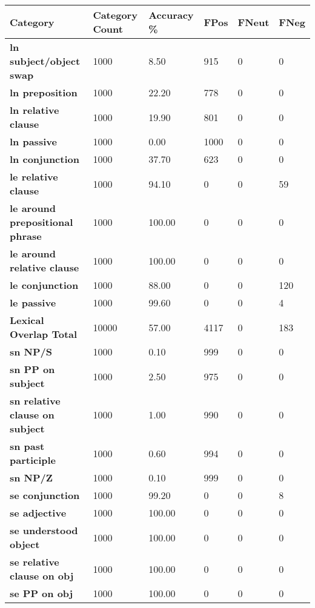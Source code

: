 \documentclass[11pt,a4paper]{article}
\begin{document}
\begin{table}[!hbt]
    \centering
    \tiny
    \centering
    \begin{tabular}{p{}|p{} p{} p{} p{} p{} }
        \textbf{Category} & \textbf{Category Count} & \textbf{Accuracy \%} & \textbf{FPos} & \textbf{FNeut} & \textbf{FNeg} \\
        \hline
        \textbf{ln subject/object swap} & 1000 & 8.50 & 915 & 0 & 0 \\
        \textbf{ln preposition} & 1000 & 22.20 & 778 & 0 & 0 \\
        \textbf{ln relative clause} & 1000 & 19.90 & 801 & 0 & 0 \\
        \textbf{ln passive} & 1000 & 0.00 & 1000 & 0 & 0 \\
        \textbf{ln conjunction} & 1000 & 37.70 & 623 & 0 & 0 \\
        \textbf{le relative clause} & 1000 & 94.10 & 0 & 0 & 59 \\
        \textbf{le around prepositional phrase} & 1000 & 100.00 & 0 & 0 & 0 \\
        \textbf{le around relative clause} & 1000 & 100.00 & 0 & 0 & 0 \\
        \textbf{le conjunction} & 1000 & 88.00 & 0 & 0 & 120 \\
        \textbf{le passive} & 1000 & 99.60 & 0 & 0 & 4 \\
        \textbf{Lexical Overlap Total} & 10000 & 57.00 & 4117 & 0 & 183 \\
        \hline
        \textbf{sn NP/S} & 1000 & 0.10 & 999 & 0 & 0 \\
        \textbf{sn PP on subject} & 1000 & 2.50 & 975 & 0 & 0 \\
        \textbf{sn relative clause on subject} & 1000 & 1.00 & 990 & 0 & 0 \\
        \textbf{sn past participle} & 1000 & 0.60 & 994 & 0 & 0 \\
        \textbf{sn NP/Z} & 1000 & 0.10 & 999 & 0 & 0 \\
        \textbf{se conjunction} & 1000 & 99.20 & 0 & 0 & 8 \\
        \textbf{se adjective} & 1000 & 100.00 & 0 & 0 & 0 \\
        \textbf{se understood object} & 1000 & 100.00 & 0 & 0 & 0 \\
        \textbf{se relative clause on obj} & 1000 & 100.00 & 0 & 0 & 0 \\
        \textbf{se PP on obj} & 1000 & 100.00 & 0 & 0 & 0 \\

\end{tabular}
\end{table}
\end{document}
